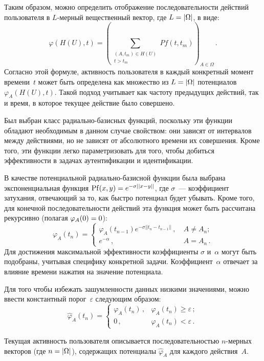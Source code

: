 \begin{multicols}{2}
Таким образом, можно определить отображение последовательности
действий пользователя в $L$-мер\-ный вещественный вектор, где $L \hm=
|\Omega|$,  в виде:
$$
  \varphi(H(U), t) = \left(
  \sum\limits_{\substack{(A, t_m) \in H(U) \\ t > t_m}} P\!f(t, t_m) \right)_{A \in \Omega}\,.
$$
Согласно этой формуле, активность пользователя в каждый конкретный
момент времени~$t$ может быть определена как множество из $L \hm=
|\Omega|$ потенциалов $\varphi_A(H(U), t)$. Такой подход учитывает
как частоту предыдущих действий, так и время, в которое текущее
действие было совершено.

Был выбран класс ра\-ди\-аль\-но-ба\-зис\-ных функций, поскольку эти функции
обладают необходимым в данном случае свойством: они зависят от
интервалов между действиями, но не зависят от абсолютного времени их
совершения. Кроме того, эти функции легко параметризовать для того,
чтобы добиться эффективности в задачах  аутентификации и
идентификации.

В качестве потенциальной ра\-ди\-аль\-но-ба\-зис\-ной функции была выбрана
экспоненциальная функция $\mathrm{Pf}(x, y) \hm= e^{-\sigma||x-y||}$, где
$\sigma$~--- коэффициент затухания, отвечающий за то, как быстро
потенциал будет убывать. Кроме того, для конечной последовательности
действий эта функция может быть рассчитана рекурсивно (полагая
$\varphi_A(0) \hm= 0$):
$$
\varphi_A(t_n)  = 
\begin{cases}
  \varphi_A(t_{n \! - \! 1})   e^{-\sigma||t_n-t_{n -  1}||}\,, &\ A \ne A_n; \\[3pt]
     e^{- \alpha}\,, &\ A = A_n\,.
\end{cases}
$$
Для достижения максимальной эффективности коэффициенты $\sigma$
 и~$\alpha$ могут быть подобраны, учитывая специфику конкретной задачи.
Коэффициент~$\alpha$ отвечает за влияние времени нажатия на значение
потенциала.

Для того чтобы избежать зашумленности данных низкими значениями,
можно ввести константный порог~$\varepsilon$ следующим образом:
$$
\label{functor_threshold}
\hat{\varphi}_A(t_n) =
\begin{cases}
  \varphi_A(t_n)\,, &\varphi_A(t_n) \ge \varepsilon\,; \\[3pt]
  0\,, &\varphi_A(t_n) < \varepsilon\,.
\end{cases}
$$

Текущая активность пользователя описывается последовательностью
$n$-мер\-ных векторов (где $n \hm= |\Omega|$), содержащих потенциалы
$\hat\varphi_A$ для каждого действия~$A$.


\end{multicols}

